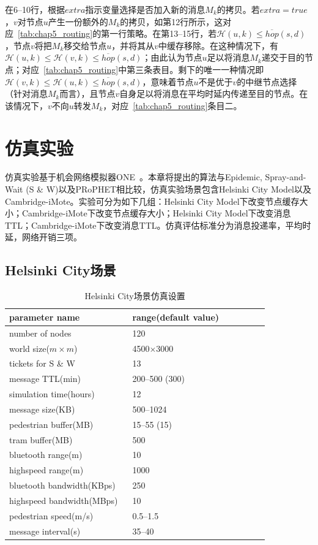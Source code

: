 在6--10行，根据$extra$指示变量选择是否加入新的消息$M_k$的拷贝。若$extra=true$，$v$对节点$u$产生一份额外的$M_k$的拷贝，如第12行所示，这对应\tablename~\ref{tab:chap5_routing}的第一行策略。在第13--15行，若$\mathcal{H}(u,k)\leq\overline{hop}(s,d)$，节点$v$将把$M_k$移交给节点$u$，并将其从$v$中缓存移除。在这种情况下，有$\mathcal{H}(u,k)\leq\mathcal{H}(v,k)\leq\overline{hop}(s,d)$；由此认为节点$u$足以将消息$M_k$递交于目的节点；对应\tablename~\ref{tab:chap5_routing}中第三条表目。剩下的唯一一种情况即$\mathcal{H}(v,k)\leq\mathcal{H}(u,k)\leq\overline{hop}(s,d)$，意味着节点$u$不是优于$v$的中继节点选择（针对消息$M_k$而言），且节点$v$自身足以将消息在平均时延内传递至目的节点。在该情况下，$v$不向$u$转发$M_k$，对应\tablename~\ref{tab:chap5_routing}条目二。

\section{仿真实验}
\label{chap5:仿真实验}

仿真实验基于机会网络模拟器ONE~。本章将提出的算法与Epidemic, Spray-and-Wait (S \& W)以及PRoPHET相比较，仿真实验场景包含Helsinki City Model以及Cambridge-iMote。实验可分为如下几组：Helsinki City Model下改变节点缓存大小；Cambridge-iMote下改变节点缓存大小；Helsinki City Model下改变消息TTL；Cambridge-iMote下改变消息TTL。仿真评估标准分为消息投递率，平均时延，网络开销三项。

\subsection{Helsinki City场景}



\begin{table}
\centering
\caption{Helsinki City场景仿真设置}
\label{tab:chap5_simulation_helsinki}
\begin{tabular}{
p{0.45\linewidth}<{\centering}
p{0.5\linewidth}<{\centering}
}
\hline
\textbf{parameter name} & \textbf{range(default value)} \\
\hline
number of nodes & 120  \\
world size($m\times m$) & 4500$\times$3000  \\
tickets for S \& W & 13 \\
message TTL(min) & 200--500 (300) \\
simulation time(hours) & 12 \\
message size(KB) & 500--1024 \\
pedestrian buffer(MB) & 15--55 (15) \\
tram buffer(MB) & 500 \\
bluetooth range(m) & 10 \\
highspeed range(m) & 1000 \\ 
bluetooth bandwidth(KBps) & 250 \\
highspeed bandwidth(MBps) & 10 \\ 
pedestrian speed(m/s) & 0.5--1.5  \\
message interval(s) & 35--40 \\
\hline
\end{tabular}
\end{table}

